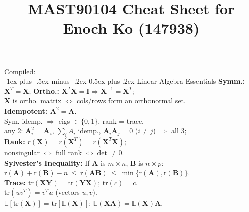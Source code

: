 \documentclass[10pt,landscape]{article}
\title{MAST90104 Cheat Sheet for Enoch Ko (147938)}
\makeatletter
\renewcommand{\subsection}{\@startsection{subsection}{2}{0mm}%
                                {-1ex plus -.5ex minus -.2ex}%
                                {0.5ex plus .2ex}%
                                {\normalfont\small\bfseries}}
\makeatother
\begin{document}
\raggedright
\footnotesize

\begin{multicols}{3}
\setlength{\premulticols}{1pt}
\setlength{\postmulticols}{1pt}
\setlength{\multicolsep}{1pt}
\setlength{\columnsep}{2pt}
Compiled: \DTMnow\\
\subsection{Linear Algebra Essentials}
\textbf{Symm.:} $\mathbf{X}^T=\mathbf{X}$;\quad 
\textbf{Ortho.:} $\mathbf{X}^T\mathbf{X}=\mathbf{I} \Rightarrow \mathbf{X}^{-1}=\mathbf{X}^T$;\\ 
$\mathbf{X}$ is ortho. matrix $\Leftrightarrow$ cols/rows form an orthonormal set.\\
\smallskip
\textbf{Idempotent:} $\mathbf{A}^2=\mathbf{A}$.\\
\hspace*{1em} Sym. idemp. $\Rightarrow$ eigs $\in\{0,1\}$, rank = trace.\\
\hspace*{1em} any 2: $ \mathbf{A}_i^2= \mathbf{A}_i$, $\sum_i A_i$ idemp., $ \mathbf{A}_i \mathbf{A}_j=0$ ($i\neq j$) $\Rightarrow$ all 3;\\
\smallskip
\textbf{Rank:} $r(\mathbf{X}) = r(\mathbf{X}^T) = r(\mathbf{X}^T \mathbf{X})$;\\
\hspace*{1em} nonsingular $\Leftrightarrow$ full rank $\Leftrightarrow \det\neq 0$.\\
\hspace*{1em} \textbf{Sylvester's Inequality:} If $\mathbf{A}$ is $m\times n$, $\mathbf{B}$ is $n\times p$: 
\hspace*{1em} $\mathrm{r}(\mathbf{A}) + \mathrm{r}(\mathbf{B}) - n \ \le \ \mathrm{r}(\mathbf{A}\mathbf{B}) \ \le \ \min\{\mathrm{r}(\mathbf{A}),\mathrm{r}(\mathbf{B})\}$.\\
\smallskip
\textbf{Trace:} $\mathrm{tr}(\mathbf{X}\mathbf{Y}) = \mathrm{tr}(\mathbf{Y}\mathbf{X})$; $\mathrm{tr}(c) = c$.\\
\hspace*{1em} $\mathrm{tr}(uv^T) = v^T u$ (vectors $u,v$).\\
\hspace*{1em} $\mathbb{E}[\mathrm{tr}(\mathbf{X})] = \mathrm{tr}[\mathbb{E}(\mathbf{X})]$; $\mathbb{E}(\mathbf{X}\mathbf{A}) = \mathbb{E}(\mathbf{X})\mathbf{A}$.\\

\end{multicols}
\end{document}
